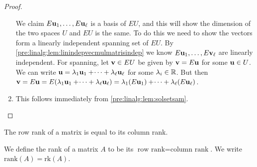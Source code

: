\documentclass[10pt, a4paper]{article}
\begin{document}
\begin{proposition}
\begin{proof}
\begin{enumerate}[label = (\roman*)]
            We claim $E\mathbf{u}_1, \dotsc, E\mathbf{u}_{\ell}$ is a basis of $EU$,
            and this will show the dimension of the two spaces $U$ and $EU$ is the same.
            To do this we need to show the vectors form a linearly independent spanning set of $EU$.
            By \autoref{pre:linalg:lem:linindepvecmulmatrisindep} we know $E\mathbf{u}_1, \dotsc, E\mathbf{v}_{\ell}$ are linearly independent.
            For spanning,
            let $\mathbf{v} \in EU$ be given by $\mathbf{v} = E\mathbf{u}$ for some $\mathbf{u} \in U$.
            We can write $\mathbf{u} = \lambda_1\mathbf{u}_1 + \dotsi + \lambda_{\ell}\mathbf{u}_{\ell}$ for some $\lambda_i \in \mathbb{R}$.
            But then $\mathbf{v} = E\mathbf{u} = E(\lambda_1\mathbf{u}_1 + \dotsi + \lambda_{\ell}\mathbf{u}_{\ell}) = \lambda_1(E\mathbf{u}_1) + \dotsi + \lambda_{\ell}(E\mathbf{u}_{\ell})$.
            \item This follows immediately from \autoref{pre:linalg:lem:solsetsam}.
        \end{enumerate}
    \end{proof}
\end{proposition}

\begin{theorem}\label{pre:linalg:thm:ranktheorem}
    The row rank of a matrix is equal to its column rank.
\end{theorem}

\begin{definition}[Rank]
    We define the rank of a matrix $A$ to be its $\text{row rank} = \text{column rank}$.
    We write $\mathrm{rank}(A) = \mathrm{rk}(A)$.
\end{definition}
\end{document}
